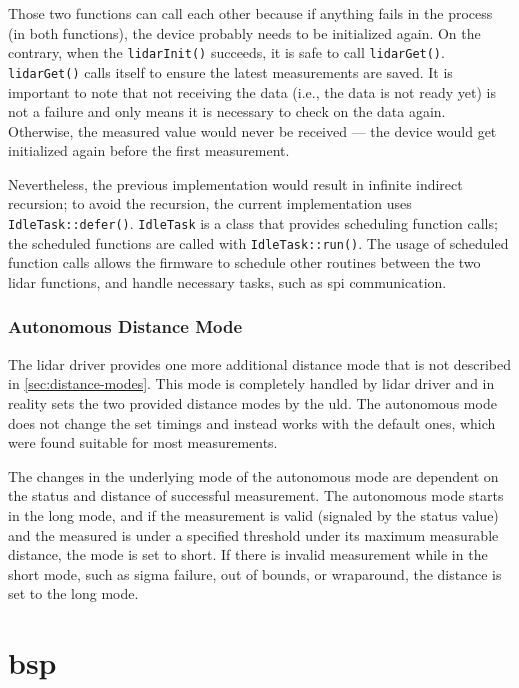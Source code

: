 \documentclass[
  digital,     %
  oneside,     %
  nosansbold,  %
  nocolorbold, %
  nolof,         %
  nolot,         %
]{fithesis4}
\newcommand{\TODO}[1]{#1} %
\newcommand{\TODOLIST}[1]{}
\begin{document}
Those two functions can call each other because if anything fails in the process (in both
functions), the device probably needs to be initialized again. On the contrary, when the
\lstinline|lidarInit()| succeeds, it is safe to call \lstinline|lidarGet()|. \lstinline|lidarGet()|
calls itself to ensure the latest measurements are saved. It is important to note that not receiving
the data (i.e., the data is not ready yet) is not a failure and only means it is necessary to check
on the data again. Otherwise, the measured value would never be received --- the device would get
initialized again before the first measurement.

Nevertheless, the previous implementation would result in infinite indirect recursion; to avoid the
recursion, the current implementation uses \lstinline|IdleTask::defer()|. \lstinline|IdleTask| is a
class that provides scheduling function calls; the scheduled functions are called with
\lstinline[breaklines=false]|IdleTask::run()|. The usage of scheduled function calls allows the
firmware to schedule other routines between the two lidar functions, and handle necessary tasks,
such as \acrshort{spi} communication.

\subsection{ Autonomous Distance Mode } \label{sec:lidar-autonomous}

The \acrshort{lidar} driver provides one more additional distance mode that is not described in
\autoref{sec:distance-modes}. This mode is completely handled by \acrshort{lidar} driver and in
reality sets the two provided distance modes by the \acrshort{uld}. The autonomous mode does not
change the set timings and instead works with the default ones, which were found suitable for most
measurements.

The changes in the underlying mode of the autonomous mode are dependent on the status and distance
of successful measurement. The autonomous mode starts in the long mode, and if the measurement is
valid (signaled by the status value) and the measured is under a specified threshold under its
maximum measurable distance, the mode is set to short. If there is invalid measurement while in the
short mode, such as sigma failure, out of bounds, or wraparound, the distance is set to the long
mode.

\chapter[ Board Support Package ]{\acrlong{bsp}} \label{ch:bsp}
\TODOLIST{
\begin{itemize}
    \item \acrshort{bsp} = providing i2c functions to \acrshort{lidar} library + easier portability
    \item \acrshort{bsp} = global namespace \lstinline{Gpio::Pin} initialization is **UB**
\end{itemize}
}
\end{document}
